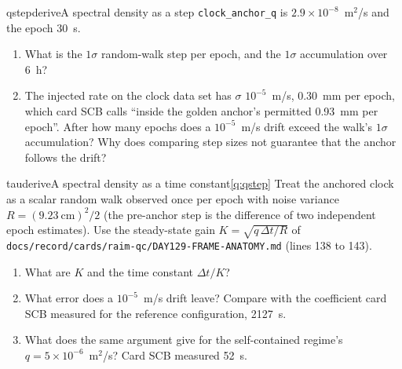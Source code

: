 \begin{question}{qstep}{derive}{A spectral density as a step}{}
\texttt{clock\_anchor\_q} is $2.9\times10^{-8}$~m$^2$/s and the epoch 30~s.
\begin{enumerate}[leftmargin=*, itemsep=1pt]
\item What is the $1\sigma$ random-walk step per epoch, and the $1\sigma$
      accumulation over 6~h?
\item The injected rate on the clock data set has $\sigma$ $10^{-5}$~m/s, 0.30~mm
      per epoch, which card SCB calls ``inside the golden anchor's permitted
      0.93~mm per epoch''. After how many epochs does a $10^{-5}$~m/s drift exceed
      the walk's $1\sigma$ accumulation? Why does comparing step sizes not
      guarantee that the anchor follows the drift?
\end{enumerate}
\end{question}

\begin{question}{tau}{derive}{A spectral density as a time constant}{\ref{q:qstep}}
Treat the anchored clock as a scalar random walk observed once per epoch with
noise variance $R = (9.23~\mathrm{cm})^2/2$ (the pre-anchor step is the difference
of two independent epoch estimates). Use the steady-state gain
$K = \sqrt{q\,\Delta t/R}$ of \texttt{docs/record/cards/raim-qc/DAY129-FRAME-ANATOMY.md}
(lines 138 to 143).
\begin{enumerate}[leftmargin=*, itemsep=1pt]
\item What are $K$ and the time constant $\Delta t/K$?
\item What error does a $10^{-5}$~m/s drift leave? Compare with the coefficient
      card SCB measured for the reference configuration, 2127~s.
\item What does the same argument give for the self-contained regime's
      $q = 5\times10^{-6}$~m$^2$/s? Card SCB measured 52~s.
\end{enumerate}
\end{question}


